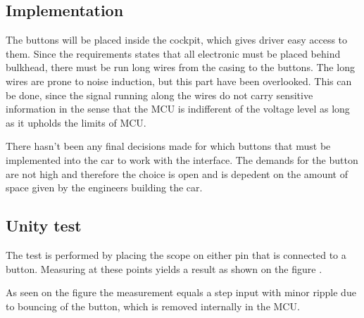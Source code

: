 \subsection{Implementation}
The buttons will be placed inside the cockpit, which gives driver easy access to them. Since the requirements states that all electronic must be placed behind bulkhead, there must be run long wires from the casing to the buttons. The long wires are prone to noise induction, but this part have been overlooked. This can be done, since the signal running along the wires do not carry sensitive information in the sense that the MCU is indifferent of the voltage level as long as it upholds the limits of MCU.

There hasn't been any final decisions made for which buttons that must be implemented into the car to work with the interface. The demands for the button are not high and therefore the choice is open and is depedent on the amount of space given by the engineers building the car.

\subsection{Unity test}
The test is performed by placing the scope on either pin that is connected to a button. Measuring at these points yields a result as shown on the figure .

As seen on the figure  the measurement equals a step input with minor ripple due to bouncing of the button, which is removed internally in the MCU. 